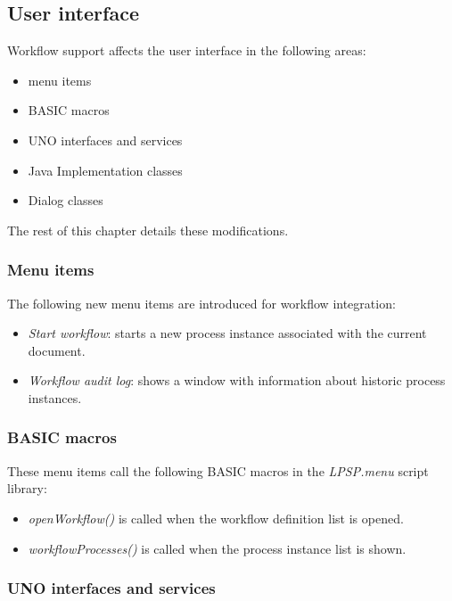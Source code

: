 \subsection{User interface}

Workflow support affects the user interface in the following areas:

\begin{itemize}
\item menu items
\item BASIC macros
\item UNO interfaces and services
\item Java Implementation classes
\item Dialog classes
\end{itemize}

The rest of this chapter details these modifications.

\subsubsection*{Menu items}

The following new menu items are introduced for workflow integration:

\begin{itemize}
\item \emph{Start workflow}: starts a new process instance associated with the current document.
\item \emph{Workflow audit log}: shows a window with information about historic process instances.
\end{itemize}

\subsubsection*{BASIC macros}

These menu items call the following BASIC macros in the \emph{LPSP.menu} script library:

\begin{itemize}
\item \emph{openWorkflow()} is called when the workflow definition list is opened.
\item \emph{workflowProcesses()} is called when the process instance list is shown.
\end{itemize}

\subsubsection*{UNO interfaces and services}


